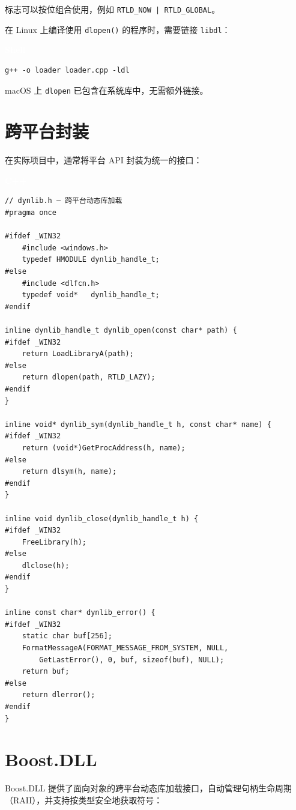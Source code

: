 \documentclass[12pt,a4paper,fontset=fandol]{ctexbook}
\newcommand{\cpplabel}{%
  \begin{tcolorbox}[enhanced,colback=cppheadbg,colframe=cppheadbg,
    arc=1mm,boxrule=0mm,left=6pt,right=6pt,top=2pt,bottom=2pt,
    halign=left,oversize]
    \textcolor{white}{\small\bfseries C++}
  \end{tcolorbox}\vspace{-4pt}}
\newcommand{\bashlabel}{%
  \begin{tcolorbox}[enhanced,colback=black!80,colframe=black!80,
    arc=1mm,boxrule=0mm,left=6pt,right=6pt,top=2pt,bottom=2pt,
    halign=left,oversize]
    \textcolor{white}{\small\bfseries Shell}
  \end{tcolorbox}\vspace{-4pt}}
\newcommand{\Fn}[1]{\texttt{#1()}}
\begin{document}
标志可以按位组合使用，例如 \texttt{RTLD\_NOW | RTLD\_GLOBAL}。

\begin{tcolorbox}[note={编译时需链接 dl 库}]
在 Linux 上编译使用 \Fn{dlopen} 的程序时，需要链接 \texttt{libdl}：
\bashlabel
\begin{lstlisting}[style=bashstyle]
g++ -o loader loader.cpp -ldl
\end{lstlisting}
macOS 上 \texttt{dlopen} 已包含在系统库中，无需额外链接。
\end{tcolorbox}

\section{跨平台封装}

在实际项目中，通常将平台 API 封装为统一的接口：

\cpplabel
\begin{lstlisting}[style=cppstyle]
// dynlib.h — 跨平台动态库加载
#pragma once

#ifdef _WIN32
    #include <windows.h>
    typedef HMODULE dynlib_handle_t;
#else
    #include <dlfcn.h>
    typedef void*   dynlib_handle_t;
#endif

inline dynlib_handle_t dynlib_open(const char* path) {
#ifdef _WIN32
    return LoadLibraryA(path);
#else
    return dlopen(path, RTLD_LAZY);
#endif
}

inline void* dynlib_sym(dynlib_handle_t h, const char* name) {
#ifdef _WIN32
    return (void*)GetProcAddress(h, name);
#else
    return dlsym(h, name);
#endif
}

inline void dynlib_close(dynlib_handle_t h) {
#ifdef _WIN32
    FreeLibrary(h);
#else
    dlclose(h);
#endif
}

inline const char* dynlib_error() {
#ifdef _WIN32
    static char buf[256];
    FormatMessageA(FORMAT_MESSAGE_FROM_SYSTEM, NULL,
        GetLastError(), 0, buf, sizeof(buf), NULL);
    return buf;
#else
    return dlerror();
#endif
}
\end{lstlisting}

\section{Boost.DLL}

Boost.DLL 提供了面向对象的跨平台动态库加载接口，自动管理句柄生命周期（RAII），并支持按类型安全地获取符号：
\end{document}
